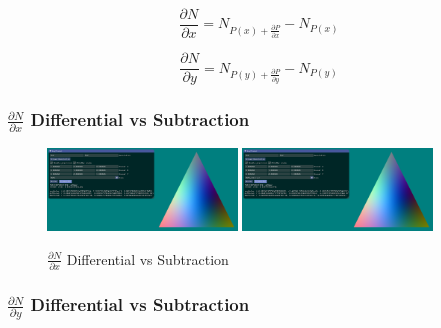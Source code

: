 \documentclass[12pt]{article}
\newcommand{\oneimgwidth}{0.45}
\newcommand{\dpdx}{\frac{\partial P}{\partial x}}
\newcommand{\dpdy}{\frac{\partial P}{\partial y}}
\newcommand{\dnndx}{\frac{\partial N}{\partial x}}
\newcommand{\dnndy}{\frac{\partial N}{\partial y}}
\begin{document}
\begin{equation}
\dnndx = N_{P(x) + \dpdx} - N_{P(x)}
\end{equation}

\begin{equation}
\dnndy = N_{P(y) + \dpdy} - N_{P(y)}
\end{equation}

\subsubsection{$\dnndx$ Differential vs Subtraction}

\begin{figure}[htbp] 
	\centering
	\includegraphics[width=\oneimgwidth\textwidth]{dnn/dnndx.png}
	\includegraphics[width=\oneimgwidth\textwidth]{dnn/dnndx_sub.png}
	\caption{$\dnndx$ Differential vs Subtraction}
	\label{fig:dndx}
\end{figure}

\FloatBarrier

\subsubsection{$\dnndy$ Differential vs Subtraction}
\end{document}
